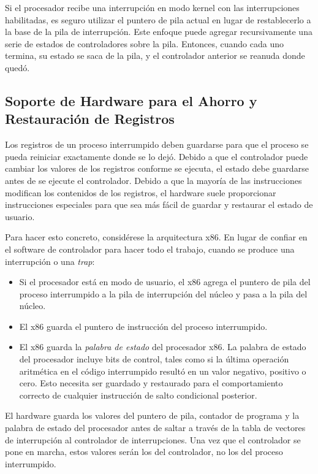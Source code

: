 \documentclass[10pt]{book}
\begin{document}
Si el procesador recibe una interrupción en modo kernel con las interrupciones habilitadas, es seguro utilizar el puntero de pila actual en lugar de restablecerlo a la base de la pila de interrupción. Este enfoque puede agregar recursivamente una serie de estados de controladores sobre la pila. Entonces, cuando cada uno termina, su estado se saca de la pila, y el controlador anterior se reanuda donde quedó.

\subsection{Soporte de Hardware para el Ahorro y Restauración de Registros}
Los registros de un proceso interrumpido deben guardarse para que el proceso se pueda reiniciar exactamente donde se lo dejó. Debido a que el controlador puede cambiar los valores de los registros conforme se ejecuta, el estado debe guardarse antes de se ejecute el controlador. Debido a que la mayoría de las instrucciones modifican los contenidos de los registros, el hardware suele proporcionar instrucciones especiales para que sea más fácil de guardar y restaurar el estado de usuario.

Para hacer esto concreto, considérese la arquitectura {\mf x86}. En lugar de confiar en el software de controlador para hacer todo el trabajo, cuando se produce una interrupción o una \textit{trap}:
\begin{itemize}
\item Si el procesador está en modo de usuario, el {\mf x86} agrega el puntero de pila del proceso interrumpido a la pila de interrupción del núcleo y pasa a la pila del núcleo.

\item El {\mf x86} guarda el puntero de instrucción del proceso interrumpido.

\item El {\mf x86} guarda la \textit{palabra de estado} del procesador {\mf x86}. La palabra de estado del procesador incluye bits de control, tales como si la última operación aritmética en el código interrumpido resultó en un valor negativo, positivo o cero. Esto necesita ser guardado y restaurado para el comportamiento correcto de cualquier instrucción de salto condicional posterior.
\end{itemize}

El hardware guarda los valores del puntero de pila, contador de programa y la palabra de estado del procesador antes de saltar a través de la tabla de vectores de interrupción al controlador de interrupciones. Una vez que el controlador se pone en marcha, estos valores serán los del controlador, no los del proceso interrumpido.
\end{document}
